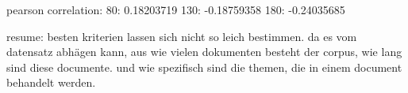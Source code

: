 pearson correlation: 
80: 0.18203719
130: -0.18759358
180: -0.24035685

resume: besten kriterien lassen sich nicht so leich bestimmen. da es vom datensatz abhägen kann, aus wie vielen dokumenten besteht der corpus, wie lang sind diese documente. und wie spezifisch sind die themen, die in einem document behandelt werden.


%
%
